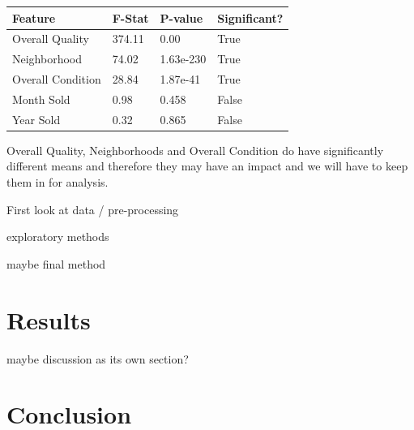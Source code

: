 \documentclass{article}
\begin{document}
	\begin{table}[]
		\centering
		\begin{tabular}{llll}
		\hline
		\multicolumn{1}{|l|}{Feature} & \multicolumn{1}{l|}{F-Stat} & \multicolumn{1}{l|}{P-value} & \multicolumn{1}{l|}{Significant?} \\ \hline
		Overall Quality               & 374.11                      & 0.00                         & True                              \\
		Neighborhood                  & 74.02                       & 1.63e-230                    & True                              \\
		Overall Condition             & 28.84                       & 1.87e-41                     & True                              \\
		Month Sold                    & 0.98                        & 0.458                        & False                             \\
		Year Sold                     & 0.32                        & 0.865                        & False                            
		\end{tabular}
		\end{table}
	

	Overall Quality, Neighborhoods and Overall Condition do have significantly different means and therefore they may have an impact and we will have to keep them in for analysis.
	
	
	First look at data / pre-processing
	
	exploratory methods
	
	maybe final method
	
	
	\section{Results}
	
	
	maybe discussion as its own section?
	
	
	\section{Conclusion}
	
	
\end{document}
